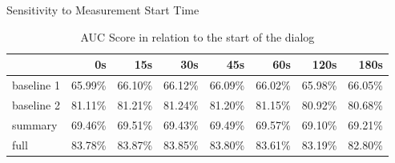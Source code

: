 \begin{frame} {Sensitivity to Measurement Start Time}
\begin{table}
\begin{center}
\begin{tabular}{lrrrrrrr}
\hline
{} & 0s & 15s & 30s & 45s & 60s & {\bf 120s} & 180s  \\
\hline
baseline 1 & 65.99\% & 66.10\% & 66.12\% & 66.09\%  & 66.02\% & 65.98\% & 66.05\%  \\
baseline 2 & 81.11\% & 81.21\% & 81.24\% & 81.20\%  & 81.15\% & 80.92\% & 80.68\%  \\
summary    & 69.46\% & 69.51\% & 69.43\% & 69.49\%  & 69.57\% & 69.10\% & 69.21\%  \\
full       & 83.78\% & 83.87\% & 83.85\% & 83.80\%  & 83.61\% & 83.19\% & 82.80\%  \\
\hline
\end{tabular}
\end{center}
\caption{ AUC Score in relation to the start of the dialog }
\label{table:starttime}
\end{table}

\end{frame}{}
